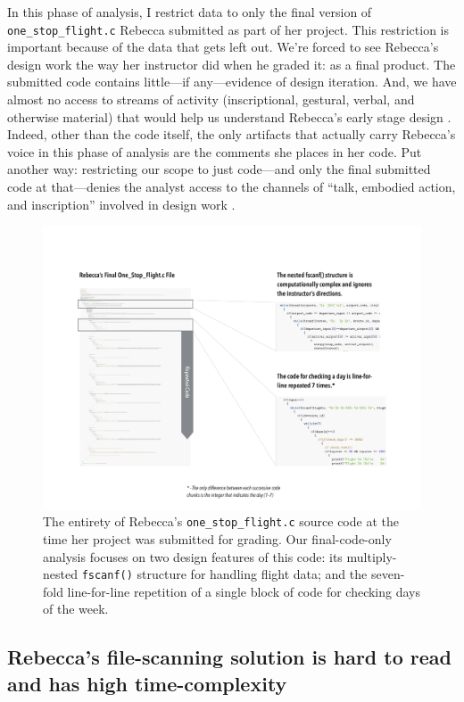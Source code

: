 In this phase of analysis, I restrict data to only the final version of \texttt{one\_stop\_flight.c} Rebecca submitted as part of her project. This restriction is important because of the data that gets left out. We're forced to see Rebecca's design work the way her instructor did when he graded it: as a final product. The submitted code contains little---if any---evidence of design iteration. And, we have almost no access to streams of activity (inscriptional, gestural, verbal, and otherwise material) that would help us understand Rebecca's early stage design \citep{petre_software_2014}. Indeed, other than the code itself, the only artifacts that actually carry Rebecca's voice in this phase of analysis are the comments she places in her code. Put another way: restricting our scope to just code---and only the final submitted code at that---denies the analyst access to the channels of ``talk, embodied action, and inscription'' involved in design work \citep[ p.~179]{hall_disrupting_2002}.

\begin{figure}[htbp]
\centering
\includegraphics{RebeccasCode/OneStopFlightSupergraphic.pdf}
\caption{The entirety of Rebecca's \texttt{one\_stop\_flight.c} source code at the time her project was submitted for grading. Our final-code-only analysis focuses on two design features of this code: its multiply-nested \texttt{fscanf()} structure for handling flight data; and the seven-fold line-for-line repetition of a single block of code for checking days of the week.}
\end{figure}

\subsection{Rebecca's file-scanning solution is hard to read and has high time-complexity}\label{rebeccas-file-scanning-solution-is-hard-to-read-and-has-high-time-complexity}

